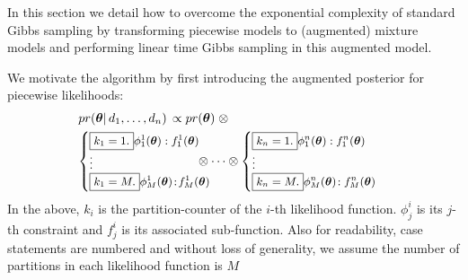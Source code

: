 In this section we detail how to overcome the exponential complexity of standard Gibbs
sampling by transforming piecewise models to (augmented) mixture models and performing
linear time Gibbs sampling in this augmented model.  

We motivate the algorithm by first introducing the augmented posterior for piecewise likelihoods:
\begin{align}
\label{e:expanded}
&pr(\boldsymbol\theta | \, d_1, \ldots, d_n) \, 
\propto 
pr(\boldsymbol\theta) \; \otimes
\\
&{\footnotesize
\begin{cases}
\boxed{k_1 = 1.} {\phi^{1}_{1}(\boldsymbol\theta)  : f^{1}_{1}(\boldsymbol\theta)}\\
\vdots
\\
\boxed{k_1 = M.} \phi^{1}_{M}(\boldsymbol\theta)  \!:\! f^{1}_{M}(\boldsymbol\theta)
\end{cases}
}%
\!\!\!\!\!\!\!\!\!\!\!\!\!
\otimes
\cdots
\otimes
{\footnotesize
\begin{cases}
\boxed{k_n = 1.} \phi^{n}_{1}(\boldsymbol\theta)  : f^{n}_{1}(\boldsymbol\theta)\\
\vdots
\\
\boxed{k_n = M.} \phi^{n}_{M}(\boldsymbol\theta)  \!: f^{n}_{M}(\boldsymbol\theta)
\end{cases}
}%
\end{align} 
%
In the above, $k_i$ is the partition-counter of the $i$-th likelihood function. 
$\phi^i_{j}$ is its $j$-th constraint and
 $f^i_{j}$ is its associated sub-function. 
 Also for readability, case statements are numbered and without loss of
generality, we assume the number of partitions in each
likelihood function is $M$

